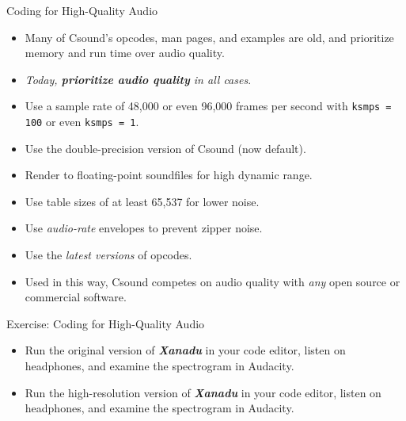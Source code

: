 \documentclass{beamer}
\begin{document}
    \begin{frame}{Coding for High-Quality Audio}
        \begin{itemize}
            \item Many of Csound's opcodes, man pages, and examples are old, and
            prioritize memory and run time over audio quality.
            \item \textit{Today, \textbf{prioritize audio quality} in all cases}.
            \item Use a sample rate of 48,000 or even 96,000 frames per second with
            \texttt{ksmps = 100} or even \texttt{ksmps = 1}.
            \item Use the double-precision version of Csound (now default).
            \item Render to floating-point soundfiles for high dynamic range.
            \item Use table sizes of at least 65,537 for lower noise.
            \item Use \textit{audio-rate} envelopes to prevent zipper noise.
            \item Use the \textit{latest versions} of opcodes.
            \item Used in this way, Csound competes on audio quality with
            \textit{any} open source or commercial software.
        \end{itemize}
    \end{frame}
    
    \begin{frame}{Exercise: Coding for High-Quality Audio}
        \begin{itemize}
            \item Run the original version of \textit{\textbf{Xanadu}} in your code
            editor, listen on headphones, and examine the spectrogram in Audacity.
            \item Run the high-resolution version of \textit{\textbf{Xanadu}} in
            your code editor, listen on headphones, and examine the spectrogram in Audacity.
        \end{itemize}
    \end{frame}
    
\end{document}
